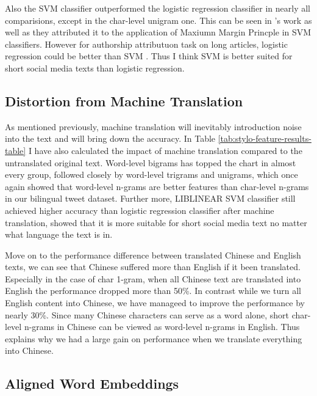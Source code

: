 \documentclass[11pt,a4paper]{article}
\begin{document}
Also the SVM classifier outperformed the logistic regression classifier in nearly all comparisions, except in the char-level unigram one. This can be seen in \citet{rocha2016authorship}'s work as well as they attributed it to the application of Maxiumn Margin Princple in SVM classifiers. However for authorship attributuon task on long articles, logistic regression could be better than SVM \cite{bogdanova2014cross}. Thus I think SVM is better suited for short social media texts than logistic regression.

\subsection{Distortion from Machine Translation}

As mentioned previously, machine translation will inevitably introduction noise into the text and will bring down the accuracy. In Table \ref{tab:stylo-feature-results-table} I have also calculated the impact of machine translation compared to the untranslated original text. Word-level bigrams has topped the chart in almost every group, followed closely by word-level trigrams and unigrams, which once again showed that word-level n-grams are better features than char-level n-grams in our bilingual tweet dataset. Further more, LIBLINEAR SVM classifier still achieved higher accuracy than logistic regression classifier after machine translation, showed that it is more suitable for short social media text no matter what language the text is in.

Move on to the performance difference between translated Chinese and English texts, we can see that Chinese suffered more than English if it been translated. Especially in the case of char 1-gram, when all Chinese text are translated into English the performance dropped more than 50\%. In contrast while we turn all English content into Chinese, we have manageed to improve the performance by nearly 30\%. Since many Chinese characters can serve as a word alone, short char-level n-grams in Chinese can be viewed as word-level n-grams in English. Thus explains why we had a large gain on performance when we translate everything into Chinese.

\subsection{Aligned Word Embeddings}
\end{document}
